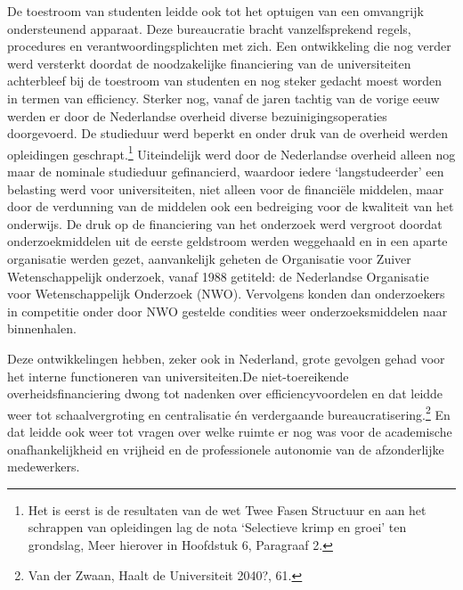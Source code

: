 \documentclass[empirical, authordate, ]{new-jote-article}
\begin{document}
	De toestroom van studenten leidde ook tot het optuigen van een omvangrijk ondersteunend apparaat. Deze bureaucratie bracht vanzelfsprekend regels, procedures en verantwoordingsplichten met zich. Een ontwikkeling die nog verder werd versterkt doordat de noodzakelijke financiering van de universiteiten achterbleef bij de toestroom van studenten en nog steker gedacht moest worden in termen van efficiency. Sterker nog, vanaf de jaren tachtig van de vorige eeuw werden er door de Nederlandse overheid diverse bezuinigingsoperaties doorgevoerd. De studieduur werd beperkt en onder druk van de overheid werden opleidingen geschrapt.\footnote{Het is eerst is de resultaten van de wet Twee Fasen Structuur en aan het schrappen van opleidingen lag de nota ‘Selectieve krimp en groei' ten grondslag, Meer hierover in Hoofdstuk 6, Paragraaf 2.} Uiteindelijk werd door de Nederlandse overheid alleen nog maar de nominale studieduur gefinancierd, waardoor iedere ‘langstudeerder' een belasting werd voor universiteiten, niet alleen voor de financiële middelen, maar door de verdunning van de middelen ook een bedreiging voor de kwaliteit van het onderwijs. De druk op de financiering van het onderzoek werd vergroot doordat onderzoekmiddelen uit de eerste geldstroom werden weggehaald en in een aparte organisatie werden gezet, aanvankelijk geheten de Organisatie voor Zuiver Wetenschappelijk onderzoek, vanaf 1988 getiteld: de Nederlandse Organisatie voor Wetenschappelijk Onderzoek (NWO). Vervolgens konden dan onderzoekers in competitie onder door NWO gestelde condities weer onderzoeksmiddelen naar binnenhalen.



	Deze ontwikkelingen hebben, zeker ook in Nederland, grote gevolgen gehad voor het interne functioneren van universiteiten.\fbox{ }De niet-toereikende overheidsfinanciering dwong tot nadenken over efficiencyvoordelen en dat leidde weer tot schaalvergroting en centralisatie én verdergaande bureaucratisering.\footnote{Van der Zwaan, Haalt de Universiteit 2040?, 61. } En dat leidde ook weer tot vragen over welke ruimte er nog was voor de academische onafhankelijkheid en vrijheid en de professionele autonomie van de afzonderlijke medewerkers.
\end{document}
